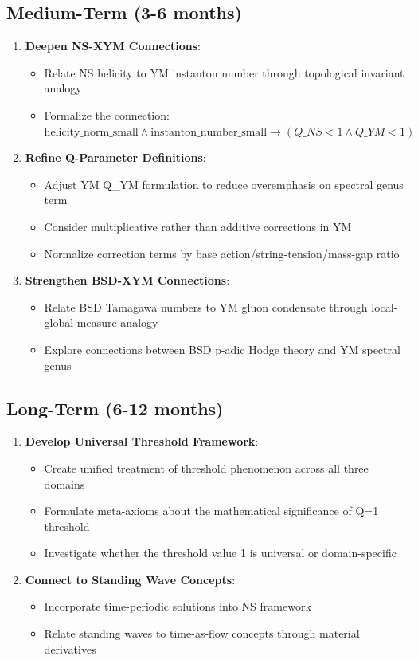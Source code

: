 \documentclass[11pt]{article}
\begin{document}
\subsection{Medium-Term (3-6 months)}
\begin{enumerate}
\item \textbf{Deepen NS-XYM Connections}:
  \begin{itemize}
  \item Relate NS helicity to YM instanton number through topological invariant analogy
  \item Formalize the connection: $\mathrm{helicity\_norm\_small} \wedge \mathrm{instanton\_number\_small} \rightarrow (Q\_NS < 1 \wedge Q\_YM < 1)$
  \end{itemize}
\item \textbf{Refine Q-Parameter Definitions}:
  \begin{itemize}
  \item Adjust YM Q\_YM formulation to reduce overemphasis on spectral genus term
  \item Consider multiplicative rather than additive corrections in YM
  \item Normalize correction terms by base action/string-tension/mass-gap ratio
  \end{itemize}
\item \textbf{Strengthen BSD-XYM Connections}:
  \begin{itemize}
  \item Relate BSD Tamagawa numbers to YM gluon condensate through local-global measure analogy
  \item Explore connections between BSD p-adic Hodge theory and YM spectral genus
  \end{itemize}
\end{enumerate}

\subsection{Long-Term (6-12 months)}
\begin{enumerate}
\item \textbf{Develop Universal Threshold Framework}:
  \begin{itemize}
  \item Create unified treatment of threshold phenomenon across all three domains
  \item Formulate meta-axioms about the mathematical significance of Q=1 threshold
  \item Investigate whether the threshold value 1 is universal or domain-specific
  \end{itemize}
\item \textbf{Connect to Standing Wave Concepts}:
  \begin{itemize}
  \item Incorporate time-periodic solutions into NS framework
  \item Relate standing waves to time-as-flow concepts through material derivatives
  \end{itemize}
\end{enumerate}
\end{document}
